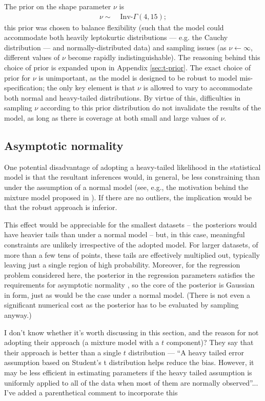 \documentclass[fleqn,usenatbib]{rasti}
\begin{document}
The prior on the shape parameter $\nu$ is
\begin{align}
    \nu \sim&\; \text{Inv-}\Gamma(4, 15);
\end{align}
this prior was chosen to balance flexibility (such that the model could
accommodate both heavily leptokurtic distributions --- e.g. the Cauchy
distribution --- and normally-distributed data) and sampling issues (as $\nu
\leftarrow \infty$, different values of $\nu$ become rapidly indistinguishable).
The reasoning behind this choice of prior is expanded upon in Appendix
\ref{sec:t-prior}. The exact choice of prior for $\nu$ is unimportant, as the
model is designed to be robust to model mis-specification; the only key element
is that $\nu$ is allowed to vary to accommodate both normal and heavy-tailed
distributions. By virtue of this, difficulties in sampling $\nu$ according to
this prior distribution do not invalidate the results of the model, as long as
there is coverage at both small and large values of $\nu$.

\subsection{Asymptotic normality}
\label{sec:formalism.asymptotic}

One potential disadvantage of adopting a heavy-tailed likelihood in the
statistical model is that the resultant inferences would, in general, be less
constraining than under the assumption of a normal model (see, e.g., the
motivation behind the mixture model proposed in \citealt{Tak:2019}).  If there
are no outliers, the implication would be that the robust approach is inferior.

This effect would be appreciable for the smallest datasets -- the posteriors
would have heavier tails than under a normal model -- but, in this case,
meaningful constraints are unlikely irrespective of the adopted model. For
larger datasets, of more than a few tens of points, these tails are effectively
multiplied out, typically leaving just a single region of high probability.
Moreover, for the regression problem considered here, the posterior in the
regression parameters satisfies the requirements for asymptotic normality
\citep[e.g.][]{Ghosh_etal:2006}, so the core of the posterior is Gaussian in
form, just as would be the case under a normal model.  (There is not even a
significant numerical cost as the posterior has to be evaluated by sampling
anyway.)

{\color{blue} I don't know whether it's worth discussing \citet{Tak:2019} in
this section, and the reason for not adopting their approach (a mixture model
with a $t$ component)? They say that their approach is better than a single $t$
distribution --- ``A heavy tailed error assumption based on Student’s t
distribution helps reduce the bias. However, it may be less efficient in
estimating parameters if the heavy tailed assumption is uniformly applied to all
of the data when most of them are normally observed''... I've added a parenthetical comment to incorporate this}
\end{document}
